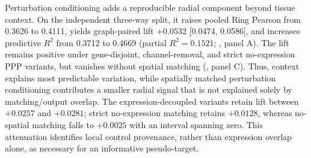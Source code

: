 \documentclass[sigconf,review,balance=false]{acmart}
\begin{document}
Perturbation conditioning adds a reproducible radial component beyond tissue
context. On the independent three-way split, it raises pooled Ring Pearson
from 0.3626 to 0.4111, yields graph-paired lift $+0.0532$
[0.0474, 0.0586], and increases predictive $R^2$ from 0.3712 to 0.4669
(partial $R^2=0.1521$; , panel A). The lift remains
positive under gene-disjoint, channel-removal, and strict no-expression PPP
variants, but vanishes without spatial matching
(, panel C). Thus, context explains most predictable
variation, while spatially matched perturbation conditioning contributes a
smaller radial signal that is not explained solely by matching/output overlap.
The expression-decoupled variants retain lift between $+0.0257$ and $+0.0281$;
strict no-expression matching retains $+0.0128$, whereas no-spatial matching
falls to $+0.0025$ with an interval spanning zero. This attenuation identifies
local control provenance, rather than expression overlap alone, as necessary
for an informative pseudo-target.
\end{document}
